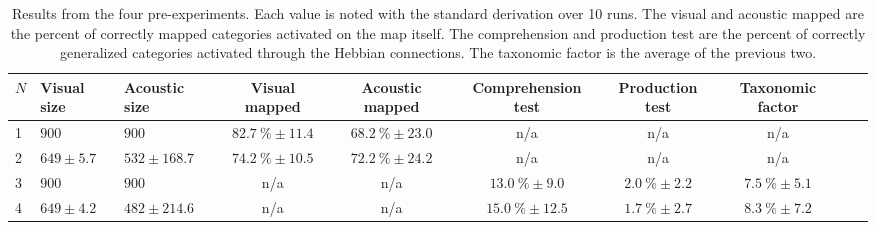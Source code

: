 \documentclass[twocolumn]{article}
\begin{document}
\begin{landscape}
    \begin{table}
        \centering
        \begin{tabular}{lllccccccc}
        $N$ & Visual size & Acoustic size & Visual mapped & Acoustic mapped & Comprehension test & Production test & Taxonomic factor \\
        \hline
        \hline
        1
            & $900$
            & $900$
            & $82.7~\% \pm 11.4$
            & $68.2~\% \pm 23.0$
            & n/a
            & n/a
            & n/a
            \\
        \hline
        2
            & $649 \pm 5.7$
            & $532 \pm 168.7$
            & $74.2~\% \pm 10.5$
            & $72.2~\% \pm 24.2$
            & n/a
            & n/a
            & n/a
            \\
        \hline
        3
            & $900$
            & $900$
            & n/a
            & n/a
            & $13.0~\% \pm 9.0$
            & $2.0~\% \pm 2.2$
            & $7.5~\% \pm 5.1$
            \\
        \hline
        4
            & $649 \pm 4.2$
            & $482 \pm 214.6$
            & n/a
            & n/a
            & $15.0~\% \pm 12.5$
            & $1.7~\% \pm 2.7$
            & $8.3~\% \pm 7.2$
            \\
        \hline
        \end{tabular}
        \caption{Results from the four pre-experiments. Each value is noted with the standard derivation over 10 runs. The visual and acoustic mapped are the percent of correctly mapped categories activated on the map itself. The comprehension and production test are the percent of correctly generalized categories activated through the Hebbian connections. The taxonomic factor is the average of the previous two.}
        \label{tab:results}
    \end{table}
\end{landscape}
\end{document}
